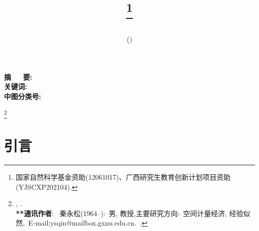\documentclass[a4paper,c5size,onecolumn,twoside,cap,Chinese]{APSart}
\begin{document}
\newcommand{\fundinfo}{国家自然科学基金资助(12061017)、广西研究生教育创新计划项目资助(YJSCXP202104).}
\newcommand{\authorsinfo}{\textbf{**通讯作者}:~
秦永松(1964--):~男, 教授,主要研究方向:~空间计量经济, 经验似然,~E-mail:ysqin@mailbox.gxnu.edu.cn.~.}


\title{\bf{\cntitle}
\thanks{\scriptsize{\fundinfo}}
}

\author{\fangsong{\cnfirstauthor\hy\hy\hy\cnsecondauthor}\\[-1pt]
{(\cnfirstinst)}}

\date{} %
\maketitle
\vspace{-6mm}
\begin{center}
\begin{minipage}[c]{14cm}
\hspace{2\ccwd}\textbf{摘~~~要:}\quad\cnabstract\\
\mbox{}\hspace{2\ccwd}\textbf{关键词:}\quad\cnkeywords\\
\mbox{}\hspace{2\ccwd}\textbf{中图分类号:}\quad\cnclassno
\end{minipage}
\end{center}
\footnote[0]{\scriptsize{\receivedate, \modifydate.\\
\authorsinfo}}\vspace{-1em}
%

\section{引\hy\hy\hy 言}
\end{document}
